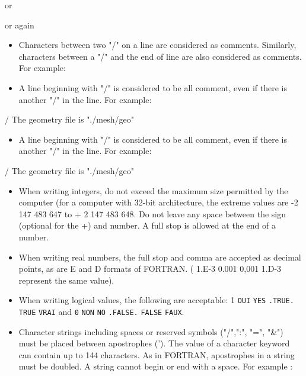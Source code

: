 
or


or again


\begin{itemize}
\item  Characters between two "/" on a line are considered as comments. Similarly, characters between a "/" and the end of line are also considered as comments. For example:
\end{itemize}


\begin{itemize}
\item  A line beginning with "/" is considered to be all comment, even if there is another "/" in the line. For example:
\end{itemize}

/ The geometry file is "./mesh/geo"

\begin{itemize}
\item  A line beginning with "/" is considered to be all comment, even if there is another "/" in the line. For example:
\end{itemize}

/ The geometry file is "./mesh/geo"

\begin{itemize}
\item  When writing integers, do not exceed the maximum size permitted by the
  computer (for a computer with 32-bit architecture, the extreme values are -2
    147 483 647 to + 2 147 483 648. Do not leave any space between the sign
    (optional for the +) and number. A full stop is allowed at the end of a
    number.

\item  When writing real numbers, the full stop and comma are accepted as
  decimal points, as are E and D formats of FORTRAN. ( 1.E-3 0.001 0,001 1.D-3
    represent the same value).

\item  When writing logical values, the following are acceptable: 1 \verb!OUI!
  \verb!YES! \verb!.TRUE.! \verb!TRUE! \verb!VRAI! and \verb!0! \verb!NON!
    \verb!NO! \verb!.FALSE.! \verb!FALSE! \verb!FAUX!.

\item  Character strings including spaces or reserved symbols ("/",":", "=",
  "\&") must be placed between apostrophes ('). The value of a character
    keyword can contain up to 144 characters. As in FORTRAN, apostrophes in a
    string must be doubled. A string cannot begin or end with a space. For
    example :
\end{itemize}

